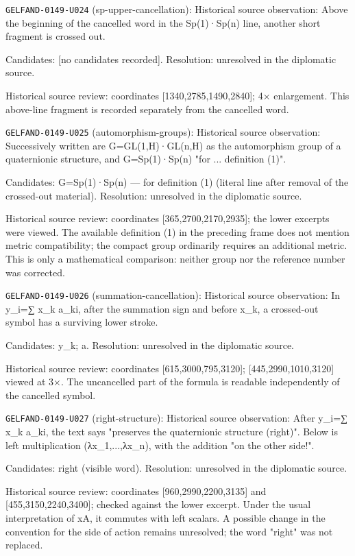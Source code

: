 \noindent\texttt{GELFAND-0149-U024} (sp-upper-cancellation): Historical source observation: Above the beginning of the cancelled word in the Sp(1)·Sp(n) line, another short fragment is crossed out.\par
Candidates: [no candidates recorded]. Resolution: unresolved in the diplomatic source.\par
Historical source review: coordinates [1340,2785,1490,2840]; 4× enlargement. This above-line fragment is recorded separately from the cancelled word.\par

\noindent\texttt{GELFAND-0149-U025} (automorphism-groups): Historical source observation: Successively written are G=GL(1,H)·GL(n,H) as the automorphism group of a quaternionic structure, and G=Sp(1)·Sp(n) "for ... definition (1)".\par
Candidates: G=Sp(1)·Sp(n) --- for definition (1) (literal line after removal of the crossed-out material). Resolution: unresolved in the diplomatic source.\par
Historical source review: coordinates [365,2700,2170,2935]; the lower excerpts were viewed. The available definition (1) in the preceding frame does not mention metric compatibility; the compact group ordinarily requires an additional metric. This is only a mathematical comparison: neither group nor the reference number was corrected.\par

\noindent\texttt{GELFAND-0149-U026} (summation-cancellation): Historical source observation: In y\_i=∑ x\_k a\_ki, after the summation sign and before x\_k, a crossed-out symbol has a surviving lower stroke.\par
Candidates: y\_k; a. Resolution: unresolved in the diplomatic source.\par
Historical source review: coordinates [615,3000,795,3120]; [445,2990,1010,3120] viewed at 3×. The uncancelled part of the formula is readable independently of the cancelled symbol.\par

\noindent\texttt{GELFAND-0149-U027} (right-structure): Historical source observation: After y\_i=∑ x\_k a\_ki, the text says "preserves the quaternionic structure (right)". Below is left multiplication (λx\_1,...,λx\_n), with the addition "on the other side!".\par
Candidates: right (visible word). Resolution: unresolved in the diplomatic source.\par
Historical source review: coordinates [960,2990,2200,3135] and [455,3150,2240,3400]; checked against the lower excerpt. Under the usual interpretation of xA, it commutes with left scalars. A possible change in the convention for the side of action remains unresolved; the word "right" was not replaced.\par

